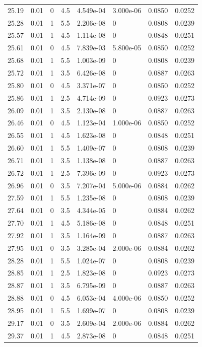 \documentclass[preview]{standalone}
\begin{document}
{{{\begin{tabular}{L{1.2cm}C{1.2cm} C{0.3cm}C{0.5cm} C{1.4cm}C{1.4cm} C{1.4cm}C{1.4cm}}
  25.19  &  0.01  & 0     & 4.5 &  4.549e-04  & 3.000e-06  & 0.0850 &  0.0252   \\ 
  25.28  &  0.01  & 1     & 5.5 &  2.206e-08  & 0  & 0.0808 &  0.0239   \\ 
  25.57  &  0.01  & 1     & 4.5 &  1.114e-08  & 0  & 0.0848 &  0.0251   \\ 
  25.61  &  0.01  & 0     & 4.5 &  7.839e-03  & 5.800e-05  & 0.0850 &  0.0252   \\ 
  25.68  &  0.01  & 1     & 5.5 &  1.003e-09  & 0  & 0.0808 &  0.0239   \\ 
  25.72  &  0.01  & 1     & 3.5 &  6.426e-08  & 0  & 0.0887 &  0.0263   \\ 
  25.80  &  0.01  & 0     & 4.5 &  3.371e-07  & 0  & 0.0850 &  0.0252   \\ 
  25.86  &  0.01  & 1     & 2.5 &  4.714e-09  & 0  & 0.0923 &  0.0273   \\ 
  26.09  &  0.01  & 1     & 3.5 &  2.130e-08  & 0  & 0.0887 &  0.0263   \\ 
  26.46  &  0.01  & 0     & 4.5 &  1.123e-04  & 1.000e-06  & 0.0850 &  0.0252   \\ 
  26.55  &  0.01  & 1     & 4.5 &  1.623e-08  & 0  & 0.0848 &  0.0251   \\ 
  26.60  &  0.01  & 1     & 5.5 &  1.409e-07  & 0  & 0.0808 &  0.0239   \\ 
  26.71  &  0.01  & 1     & 3.5 &  1.138e-08  & 0  & 0.0887 &  0.0263   \\ 
  26.72  &  0.01  & 1     & 2.5 &  7.396e-09  & 0  & 0.0923 &  0.0273   \\ 
  26.96  &  0.01  & 0     & 3.5 &  7.207e-04  & 5.000e-06  & 0.0884 &  0.0262   \\ 
  27.59  &  0.01  & 1     & 5.5 &  1.235e-08  & 0  & 0.0808 &  0.0239   \\ 
  27.64  &  0.01  & 0     & 3.5 &  4.344e-05  & 0  & 0.0884 &  0.0262   \\ 
  27.70  &  0.01  & 1     & 4.5 &  5.186e-08  & 0  & 0.0848 &  0.0251   \\ 
  27.92  &  0.01  & 1     & 3.5 &  1.164e-09  & 0  & 0.0887 &  0.0263   \\ 
  27.95  &  0.01  & 0     & 3.5 &  3.285e-04  & 2.000e-06  & 0.0884 &  0.0262   \\ 
  28.28  &  0.01  & 1     & 5.5 &  1.024e-07  & 0  & 0.0808 &  0.0239   \\ 
  28.85  &  0.01  & 1     & 2.5 &  1.823e-08  & 0  & 0.0923 &  0.0273   \\ 
  28.87  &  0.01  & 1     & 3.5 &  6.795e-09  & 0  & 0.0887 &  0.0263   \\ 
  28.88  &  0.01  & 0     & 4.5 &  6.053e-04  & 4.000e-06  & 0.0850 &  0.0252   \\ 
  28.95  &  0.01  & 1     & 5.5 &  1.699e-07  & 0  & 0.0808 &  0.0239   \\ 
  29.17  &  0.01  & 0     & 3.5 &  2.609e-04  & 2.000e-06  & 0.0884 &  0.0262   \\ 
  29.37  &  0.01  & 1     & 4.5 &  2.873e-08  & 0  & 0.0848 &  0.0251   \\ 
\hline 
\end{tabular} 

}}}
\end{document}
